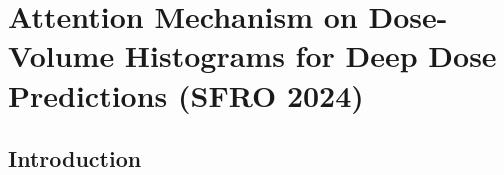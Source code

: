 




\section{Attention Mechanism on Dose-Volume Histograms for Deep Dose Predictions (SFRO 2024)}
\subsection{Introduction}

